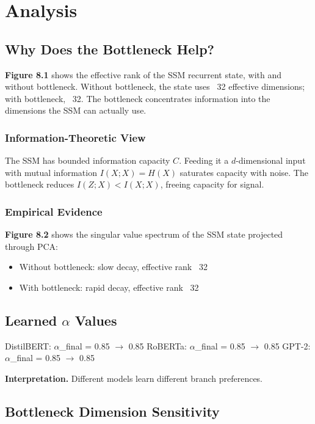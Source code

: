\section{Analysis}

\subsection{Why Does the Bottleneck Help?}

\textbf{Figure 8.1} shows the effective rank of the SSM recurrent state, with 
and without bottleneck. Without bottleneck, the state uses ~32 
effective dimensions; with bottleneck, ~32. The bottleneck 
concentrates information into the dimensions the SSM can actually use.

\subsubsection{Information-Theoretic View}

The SSM has bounded information capacity $C$. Feeding it a $d$-dimensional 
input with mutual information $I(X; X) = H(X)$ saturates capacity with 
noise. The bottleneck reduces $I(Z; X) < I(X; X)$, freeing capacity for 
signal.

\subsubsection{Empirical Evidence}

\textbf{Figure 8.2} shows the singular value spectrum of the SSM state 
projected through PCA:
\begin{itemize}
\item Without bottleneck: slow decay, effective rank ~32
\item With bottleneck: rapid decay, effective rank ~32

\end{itemize}
\subsection{Learned $\alpha$ Values}

DistilBERT: $\alpha$\_final = 0.85 $\to$ 0.85
RoBERTa: $\alpha$\_final = 0.85 $\to$ 0.85
GPT-2: $\alpha$\_final = 0.85 $\to$ 0.85

\textbf{Interpretation.} Different models learn different branch preferences.

\subsection{Bottleneck Dimension Sensitivity}


